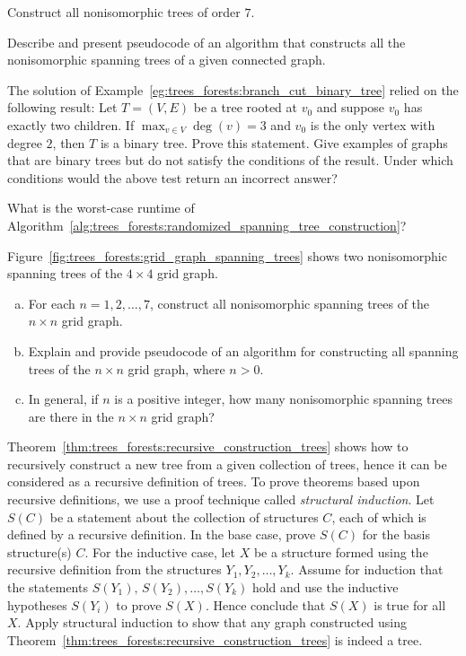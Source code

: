 \begin{problem}
\item Construct all nonisomorphic trees of order $7$.

\item Describe and present pseudocode of an algorithm that constructs
  all the nonisomorphic spanning trees of a given connected graph.

\item\label{prob:trees_forests:binary_tree_test} The solution of
  Example~\ref{eg:trees_forests:branch_cut_binary_tree} relied on the
  following result: Let $T = (V,E)$ be a tree rooted at $v_0$ and
  suppose $v_0$ has exactly two children. If
  $\max_{v \in V} \deg(v) = 3$ and $v_0$ is the only vertex with
  degree $2$, then $T$ is a binary tree. Prove this statement. Give
  examples of graphs that are binary trees but do not satisfy the
  conditions of the result. Under which conditions would the above
  test return an incorrect answer?

\item What is the worst-case runtime of
  Algorithm~\ref{alg:trees_forests:randomized_spanning_tree_construction}?

\item Figure~\ref{fig:trees_forests:grid_graph_spanning_trees} shows
  two nonisomorphic spanning trees of the $4 \times 4$ grid graph.
  \begin{enumerate}[(a)]
  \item For each $n = 1, 2, \dots, 7$, construct all nonisomorphic
    spanning trees of the $n \times n$ grid graph.

  \item Explain and provide pseudocode of an algorithm for
    constructing all spanning trees of the $n \times n$ grid graph,
    where $n > 0$.

  \item In general, if $n$ is a positive integer, how many
    nonisomorphic spanning trees are there in the $n \times n$ grid
    graph?
  \end{enumerate}

\item Theorem~\ref{thm:trees_forests:recursive_construction_trees}
  shows how to recursively construct a new tree from a given
  collection of trees, hence it can be considered as a recursive
  definition of trees. To prove theorems based upon recursive
  definitions, we use a proof technique called
  \emph{structural induction}. Let $S(C)$   be a statement about the
  collection of structures $C$, each of which is defined by a
  recursive definition. In the base case, prove $S(C)$ for the basis
  structure(s) $C$. For the inductive case, let $X$ be a structure
  formed using the recursive definition from the structures
  $Y_1, Y_2, \dots, Y_k$. Assume for induction that the statements
  $S(Y_1),\, S(Y_2), \dots, S(Y_k)$ hold and use the inductive
  hypotheses $S(Y_i)$ to prove $S(X)$. Hence conclude that $S(X)$ is
  true for all $X$. Apply structural induction to show that any graph
  constructed using
  Theorem~\ref{thm:trees_forests:recursive_construction_trees} is
  indeed a tree.


\end{problem}
